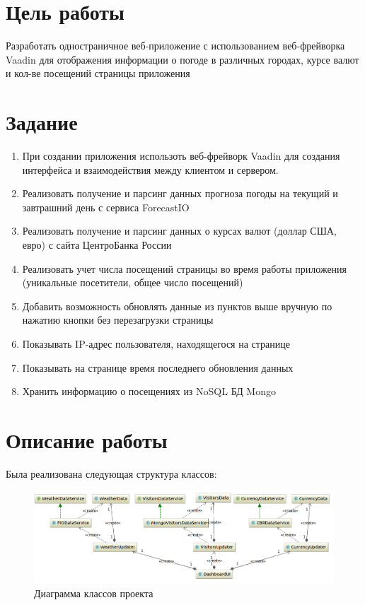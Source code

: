 \documentclass{article}
\begin{document}
\begin{spacing}{2.0}
\section*{Цель работы}

Разработать одностраничное веб-приложение с использованием веб-фрейворка Vaadin для отображения 
информации о погоде в различных городах, курсе валют и кол-ве посещений страницы приложения


\section*{Задание}

\begin{enumerate}

\item При создании приложения использоть веб-фрейворк Vaadin для создания интерфейса и взаимодействия между клиентом и сервером.
\item Реализовать получение и парсинг данных прогноза погоды на текущий и завтрашний день с сервиса ForecastIO
\item Реализовать получение и парсинг данных о курсах валют (доллар США, евро) с сайта ЦентроБанка России
\item Реализовать учет числа посещений страницы во время работы приложения (уникальные посетители, общее число посещений)
\item Добавить возможность обновлять данные из пунктов выше вручную по нажатию кнопки без перезагрузки страницы
\item Показывать IP-адрес пользователя, находящегося на странице
\item Показывать на странице время последнего обновления данных
\item Хранить информацию о посещениях из NoSQL БД Mongo

\end{enumerate}

\section*{Описание работы}

Была реализована следующая структура классов:

\begin{figure}[h]
\centering
\includegraphics[width=\textwidth]{uml}
\caption{Диаграмма классов проекта}
\end{figure}


\end{spacing}
\end{document}
